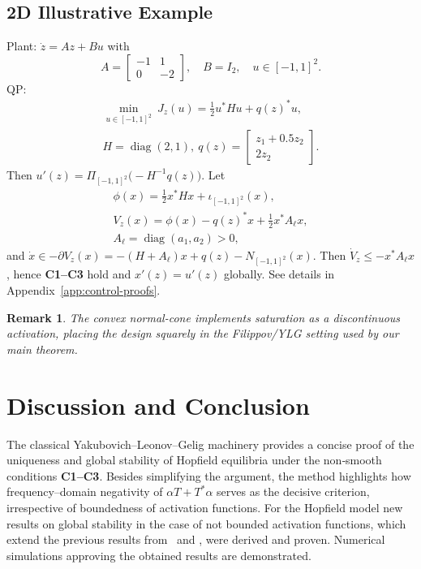 \documentclass[journal]{IEEEtran}
\theoremstyle{myplain}
\newtheorem{remark}{Remark}
\begin{document}
\subsection{2D Illustrative Example}\label{subsec:2d-example-control}
Plant: \(\dot z = Az+Bu\) with
\[
A=\begin{bmatrix}-1&1\\0&-2\end{bmatrix},\quad
B=I_2,\quad u\in[-1,1]^2.
\]
QP:
\begin{multline*}    
  \min_{u\in[-1,1]^2}\ J_z(u)=\tfrac12 u^* H u + q(z)^* u, \\
  H=\operatorname{diag}(2,1),\ 
  q(z)=\begin{bmatrix}z_1+0.5 z_2\\ 2z_2\end{bmatrix}.
\end{multline*}
Then \(u'(z)=\Pi_{[-1,1]^2}\big(-H^{-1}q(z)\big)\).
Let
\begin{multline*}
  \phi(x)=\tfrac12 x^* Hx+\iota_{[-1,1]^2}(x),\\
  V_z(x)=\phi(x)-q(z)^* x+\tfrac12 x^* A_\ell x,\\ 
  A_\ell=\operatorname{diag}(a_1,a_2)>0,
\end{multline*}
and \(\dot x\in -\partial V_z(x)=-(H+A_\ell)x+q(z)-N_{[-1,1]^2}(x)\).
Then \(\dot V_z\le -x^* A_\ell x\), hence \textbf{C1--C3} hold and \(x'(z)=u'(z)\) globally. 
See details in Appendix~\ref{app:control-proofs}.
\begin{remark}
The convex normal-cone implements saturation as a discontinuous activation, placing the design squarely in the Filippov/YLG setting used by our main theorem.
\end{remark}


\section{Discussion and Conclusion}\label{sec:concl}
The classical Yakubovich--Leonov--Gelig machinery provides a concise proof
of the uniqueness and global stability of Hopfield equilibria under the
non‑smooth conditions \textbf{C1--C3}.  Besides simplifying the argument, the method
highlights how frequency–domain negativity of \(\alpha T+T^{\!*}\alpha\)
serves as the decisive criterion, irrespective of boundedness
of activation functions. For the Hopfield model new results on global stability
in the case of not bounded activation functions,
which extend the previous results from~\cite[see Theorems~1-3]{p1} 
and \cite[see Theorems~1-3]{our_paper}, 
were derived and proven.
Numerical simulations approving the obtained results are demonstrated.
\end{document}
